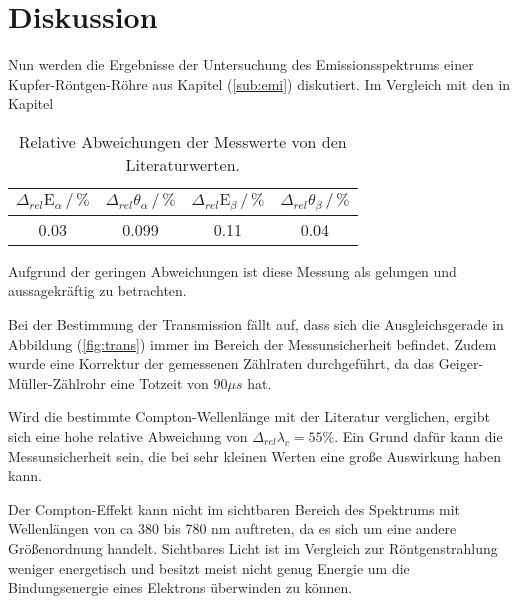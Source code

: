 \newpage
\section{Diskussion}
\label{sec:Diskussion}
\noindent
Nun werden die Ergebnisse der Untersuchung des Emissionsspektrums einer Kupfer-Röntgen-Röhre aus Kapitel (\ref{sub:emi}) diskutiert.
Im Vergleich mit den in Kapitel %

\begin{table}
    \centering
    \caption{Relative Abweichungen der Messwerte von den Literaturwerten.}
    \begin{tabular}{c c c c}
    \toprule
    $\Delta_{rel}\text{E}_\alpha \,/\, \%$ & $\Delta_{rel}\theta_\alpha \,/\, \% $ & $\Delta_{rel}\text{E}_\beta \,/\, \%$ &$\Delta_{rel}\theta_\beta \,/\, \% $\\
    \midrule 
    0.03& 0.099& 0.11& 0.04 \\
    \bottomrule
    \end{tabular}
    \label{tab:diskemi}
    \end{table}

\noindent
Aufgrund der geringen Abweichungen ist diese Messung als gelungen und aussagekräftig zu betrachten.

\noindent
Bei der Bestimmung der Transmission fällt auf, dass sich die Ausgleichsgerade in Abbildung (\ref{fig:trans}) immer im Bereich der Messunsicherheit befindet.
Zudem wurde eine Korrektur der gemessenen Zählraten durchgeführt, da das Geiger-Müller-Zählrohr eine Totzeit von $90 \mu s $ hat.

\noindent
Wird die bestimmte Compton-Wellenlänge mit der Literatur verglichen, 
ergibt sich eine hohe relative Abweichung von $\Delta_{rel} \lambda_c = 55 \% $.
Ein Grund dafür kann die Messunsicherheit sein, die bei sehr kleinen Werten eine große Auswirkung haben kann.

\noindent
Der Compton-Effekt kann nicht im sichtbaren Bereich des Spektrums mit Wellenlängen von ca 380 bis 780 nm auftreten, da es sich um eine andere Größenordnung handelt.
Sichtbares Licht ist im Vergleich zur Röntgenstrahlung weniger energetisch und besitzt meist nicht genug Energie um die Bindungsenergie eines Elektrons überwinden zu können.